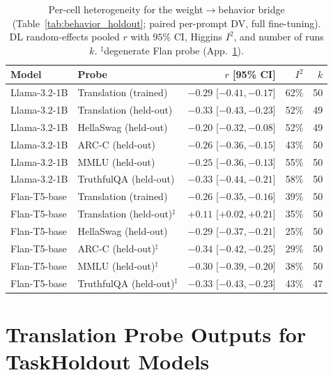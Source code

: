 \documentclass{article}
\theoremstyle{definition}
\theoremstyle{plain}
\begin{document}
\begin{table}[h]
\caption{Per-cell heterogeneity for the weight$\to$behavior bridge (Table~\ref{tab:behavior_holdout};
  paired per-prompt DV, full fine-tuning). DL random-effects pooled $r$ with $95\%$ CI, Higgins $I^2$,
  and number of runs $k$. $^\ddagger$degenerate Flan probe (App.~\ref{app:translation_probe}).}
\label{tab:behavior_het}
\begin{center}
\small
\begin{tabular}{llrrr}
\toprule
Model & Probe & $r$ [95\% CI] & $I^2$ & $k$ \\
\midrule
Llama-3.2-1B & Translation (trained)              & $-0.29$ [$-0.41,-0.17$] & 62\% & 50 \\
Llama-3.2-1B & Translation (held-out)             & $-0.33$ [$-0.43,-0.23$] & 52\% & 49 \\
Llama-3.2-1B & HellaSwag (held-out)               & $-0.20$ [$-0.32,-0.08$] & 52\% & 49 \\
Llama-3.2-1B & ARC-C (held-out)                   & $-0.26$ [$-0.36,-0.15$] & 43\% & 50 \\
Llama-3.2-1B & MMLU (held-out)                    & $-0.25$ [$-0.36,-0.13$] & 55\% & 50 \\
Llama-3.2-1B & TruthfulQA (held-out)              & $-0.33$ [$-0.44,-0.21$] & 58\% & 50 \\
Flan-T5-base & Translation (trained)              & $-0.26$ [$-0.35,-0.16$] & 39\% & 50 \\
Flan-T5-base & Translation (held-out)$^\ddagger$  & $+0.11$ [$+0.02,+0.21$] & 35\% & 50 \\
Flan-T5-base & HellaSwag (held-out)               & $-0.29$ [$-0.37,-0.21$] & 25\% & 50 \\
Flan-T5-base & ARC-C (held-out)$^\ddagger$         & $-0.34$ [$-0.42,-0.25$] & 29\% & 50 \\
Flan-T5-base & MMLU (held-out)$^\ddagger$          & $-0.30$ [$-0.39,-0.20$] & 38\% & 50 \\
Flan-T5-base & TruthfulQA (held-out)$^\ddagger$    & $-0.33$ [$-0.43,-0.23$] & 43\% & 47 \\
\bottomrule
\end{tabular}
\end{center}
\end{table}


\section{Translation Probe Outputs for TaskHoldout Models}
\label{app:translation_probe}
\end{document}
